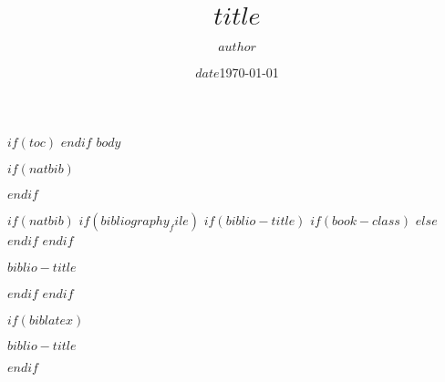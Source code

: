 \documentclass[$for(classoption)$$classoption$$sep$,$endfor$]{$documentclass$}
\title{$title$}
\author{$author$}
\date{$date$}
\date{\today}
\institute{$institute$}
\institute{Chair of Systems Design}
\begin{document}
\frame{
\maketitle
}
\note{}

$if(toc)$
$endif$
$body$

$if(natbib)$

$endif$

$if(natbib)$
  $if(bibliography_file)$
    $if(biblio-title)$
      $if(book-class)$
        \renewcommand\bibname{$biblio-title$}
      $else$
        \renewcommand\refname{$biblio-title$}
      $endif$
    $endif$
   \begin{frame}[allowframebreaks]{$biblio-title$}
   
   \end{frame}
  $endif$
$endif$

$if(biblatex)$
\begin{frame}[allowframebreaks]{$biblio-title$}
\printbibliography[heading=none]
\end{frame}
$endif$
\end{document}
